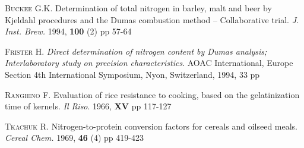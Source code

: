 \begin{thebibliography}{3}
\textsc{Buckee G.K.} Determination of total nitrogen in barley, malt and beer by Kjeldahl procedures and the Dumas combustion method -- Collaborative trial. \textit{J. Inst. Brew.} 1994, \textbf{100} (2) pp 57-64

\textsc{Frister H.} \textit{Direct determination of nitrogen content by Dumas analysis; Interlaboratory study on precision characteristics}. AOAC International, Europe Section 4th International Symposium, Nyon, Switzerland, 1994, 33 pp

\textsc{Ranghino F.} Evaluation of rice resistance to cooking, based on the gelatinization time of kernels. \textit{Il Riso}. 1966, \textbf{XV} pp 117-127

\textsc{Tkachuk R.} Nitrogen-to-protein conversion factors for cereals and oilseed meals. \textit{Cereal Chem.} 1969, \textbf{46} (4) pp 419-423

\end{thebibliography}
